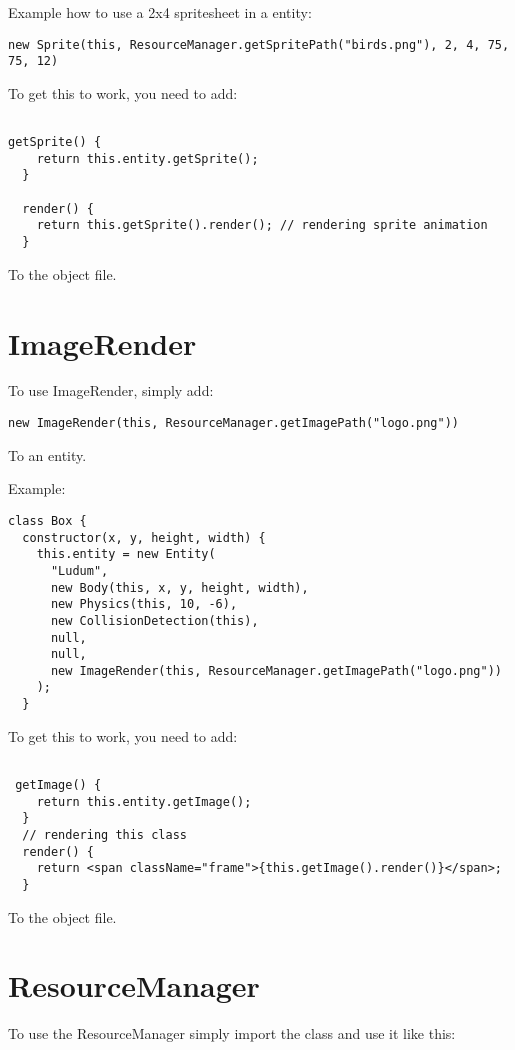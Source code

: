 Example how to use a 2x4 spritesheet in a entity:

\begin{lstlisting}
new Sprite(this, ResourceManager.getSpritePath("birds.png"), 2, 4, 75, 75, 12)
\end{lstlisting}

To get this to work, you need to add:
\begin{lstlisting}

getSprite() {
    return this.entity.getSprite();
  }

  render() {
    return this.getSprite().render(); // rendering sprite animation
  }
\end{lstlisting}

To the object file.




\section{ImageRender}
To use ImageRender, simply add:

\begin{lstlisting}
new ImageRender(this, ResourceManager.getImagePath("logo.png"))
\end{lstlisting}

To an entity.

Example:
\begin{lstlisting}
class Box {
  constructor(x, y, height, width) {
    this.entity = new Entity(
      "Ludum",
      new Body(this, x, y, height, width),
      new Physics(this, 10, -6),
      new CollisionDetection(this),
      null,
      null,
      new ImageRender(this, ResourceManager.getImagePath("logo.png"))
    );
  }
\end{lstlisting}

\newpage

To get this to work, you need to add:
\begin{lstlisting}

 getImage() {
    return this.entity.getImage();
  }
  // rendering this class
  render() {
    return <span className="frame">{this.getImage().render()}</span>;
  }
\end{lstlisting}

To the object file.

\section{ResourceManager}

To use the ResourceManager simply import the class and use it like this:

